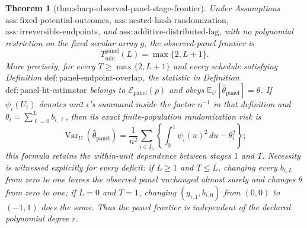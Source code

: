 \documentclass{article}
\newtheorem{theorem}{Theorem}
\begin{document}
\begin{theorem}[thm:sharp-observed-panel-stage-frontier]\label{thm:sharp-observed-panel-stage-frontier}
Under Assumptions \(\mathrm{ass:fixed\text{-}potential\text{-}outcomes}\), \(\mathrm{ass:nested\text{-}hash\text{-}randomization}\), \(\mathrm{ass:irreversible\text{-}endpoints}\), and \(\mathrm{ass:additive\text{-}distributed\text{-}lag}\), with no polynomial restriction on the fixed secular array \(g\), the observed-panel frontier is
\[
 T_{\min}^{\mathrm{panel}}(L)=\max\{2,L+1\}.
\]
More precisely, for every \(T\ge\max\{2,L+1\}\) and every schedule satisfying Definition \(\mathrm{def:panel\text{-}endpoint\text{-}overlap}\), the statistic in Definition \(\mathrm{def:panel\text{-}ht\text{-}estimator}\) belongs to \(\mathcal E_{\mathrm{panel}}(p)\) and obeys \(\mathbb E_U[\widehat\theta_{\mathrm{panel}}]=\theta\).  If \(\psi_i(U_i)\) denotes unit \(i\)'s summand inside the factor \(n^{-1}\) in that definition and \(\theta_i=\sum_{\ell=0}^{L}b_{i,\ell}\), then its exact finite-population randomization risk is
\[
 \operatorname{Var}_U(\widehat\theta_{\mathrm{panel}})
 =\frac1{n^2}\sum_{i\in I_n}
 \left\{\int_0^1\psi_i(u)^2\,du-\theta_i^2\right\};
\]
this formula retains the within-unit dependence between stages \(1\) and \(T\).  Necessity is witnessed explicitly for every deficit: if \(L\ge1\) and \(T\le L\), changing every \(b_{i,L}\) from zero to one leaves the observed panel unchanged almost surely and changes \(\theta\) from zero to one; if \(L=0\) and \(T=1\), changing \((g_{i,1},b_{i,0})\) from \((0,0)\) to \((-1,1)\) does the same.  Thus the panel frontier is independent of the declared polynomial degree \(r\).
\end{theorem}
\end{document}
